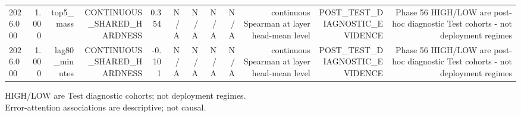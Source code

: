 \begin{table}[h!]
\begin{tabular}{lrrrrrrrrrrr}
2026.000 & 1.000 & top5\_mass & CONTINUOUS\_SHARED\_HARDNESS & 0.354 & N/A & N/A & N/A & N/A & continuous Spearman at layer head-mean level & POST\_TEST\_DIAGNOSTIC\_EVIDENCE & Phase 56 HIGH/LOW are post-hoc diagnostic Test cohorts - not deployment regimes \\
2026.000 & 1.000 & lag80\_minutes & CONTINUOUS\_SHARED\_HARDNESS & -0.101 & N/A & N/A & N/A & N/A & continuous Spearman at layer head-mean level & POST\_TEST\_DIAGNOSTIC\_EVIDENCE & Phase 56 HIGH/LOW are post-hoc diagnostic Test cohorts - not deployment regimes \\
\bottomrule
\end{tabular}
\vspace{4pt}
\footnotesize{HIGH/LOW are Test diagnostic cohorts; not deployment regimes.}\\
\footnotesize{Error-attention associations are descriptive; not causal.}\\
\end{table}
